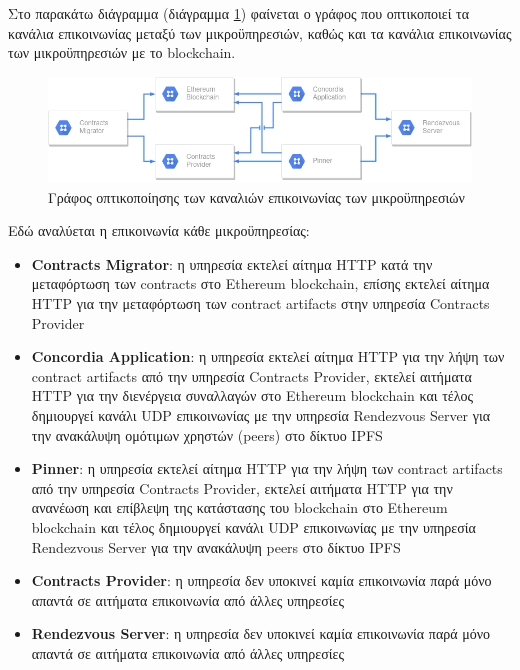 Στο παρακάτω διάγραμμα (διάγραμμα \ref{figure:4-4-communications-graph}) φαίνεται ο γράφος που οπτικοποιεί τα κανάλια επικοινωνίας μεταξύ των μικροϋπηρεσιών, καθώς και τα κανάλια επικοινωνίας των μικροϋπηρεσιών με το blockchain.

\begin{figure}[H]
    \centering
    \includegraphics[width=15cm]{assets/figures/chapter-4/4.4.communications-diagram.png}
    \caption{Γράφος οπτικοποίησης των καναλιών επικοινωνίας των μικροϋπηρεσιών}
    \label{figure:4-4-communications-graph}
\end{figure}

Εδώ αναλύεται η επικοινωνία κάθε μικροϋπηρεσίας:

\begin{itemize}
    \item \textbf{Contracts Migrator}: η υπηρεσία εκτελεί αίτημα HTTP κατά την μεταφόρτωση των \textenglish{contracts} στο Ethereum blockchain, επίσης εκτελεί αίτημα HTTP για την μεταφόρτωση των contract artifacts στην υπηρεσία Contracts Provider

    \item \textbf{Concordia Application}: η υπηρεσία εκτελεί αίτημα HTTP για την λήψη των contract \textenglish{artifacts} από την υπηρεσία Contracts Provider, εκτελεί αιτήματα HTTP για την διενέργεια συναλλαγών στο Ethereum blockchain και τέλος δημιουργεί κανάλι UDP επικοινωνίας με την υπηρεσία Rendezvous Server για την ανακάλυψη ομότιμων χρηστών (peers) στο δίκτυο IPFS

    \item \textbf{Pinner}: η υπηρεσία εκτελεί αίτημα HTTP για την λήψη των contract artifacts από την υπηρεσία Contracts Provider, εκτελεί αιτήματα HTTP για την ανανέωση και επίβλεψη της κατάστασης του blockchain στο Ethereum blockchain και τέλος δημιουργεί κανάλι UDP επικοινωνίας με την υπηρεσία Rendezvous Server για την ανακάλυψη peers στο δίκτυο IPFS

    \item \textbf{Contracts Provider}: η υπηρεσία δεν υποκινεί καμία επικοινωνία παρά μόνο απαντά σε αιτήματα επικοινωνία από άλλες υπηρεσίες

    \item \textbf{Rendezvous Server}: η υπηρεσία δεν υποκινεί καμία επικοινωνία παρά μόνο απαντά σε αιτήματα επικοινωνία από άλλες υπηρεσίες
\end{itemize}

